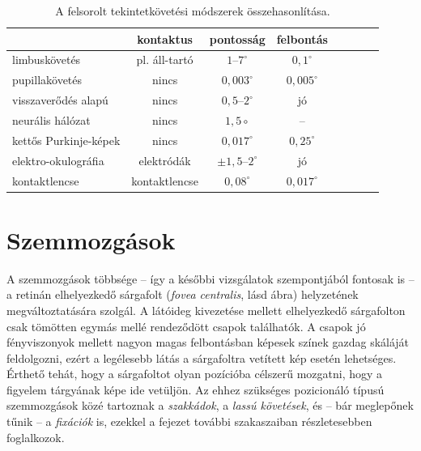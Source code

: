 \begin{table}[ht]
	\centering
	\caption{A felsorolt tekintetkövetési módszerek összehasonlítása.} \label{tab:osszehas}
	\begin{tabular}{ l || c | c | c | c | c | c | c }
	 & kontaktus & pontosság & felbontás \\ \hline \hline
	limbuskövetés & pl. áll-tartó & $1$--$7^\circ$ & $0,\!1^\circ$ \\
	pupillakövetés & nincs & $0,\!003^\circ$ & $0,\!005^\circ$ \\
	visszaverődés alapú & nincs & $0,\!5$--$2^\circ$ & jó \\
	neurális hálózat & nincs & $1,\!5\circ$ & -- \\
	kettős Purkinje-képek & nincs & $0,\!017^\circ$ & $0,\!25^\circ$ \\ 
	elektro-okulográfia & elektródák & $\pm1,\!5$--$2^\circ$ & jó \\
	kontaktlencse & kontaktlencse & $0,\!08^\circ$ & $0,\!017^\circ$ \\
	\end{tabular}
\end{table}

\section{Szemmozgások}\label{sect:osztalyozas}


A szemmozgások többsége -- így a későbbi vizsgálatok szempontjából fontosak is -- a retinán elhelyezkedő sárgafolt (\emph{fovea centralis}, lásd  ábra) helyzetének megváltoztatására szolgál. A látóideg kivezetése mellett elhelyezkedő sárgafolton csak tömötten egymás mellé rendeződött csapok találhatók. A csapok jó fényviszonyok mellett nagyon magas felbontásban képesek színek gazdag skáláját feldolgozni, ezért a legélesebb látás a sárgafoltra vetített kép esetén lehetséges. Érthető tehát, hogy a sárgafoltot olyan pozícióba célszerű mozgatni, hogy a figyelem tárgyának képe ide vetüljön. Az ehhez szükséges pozicionáló típusú szemmozgások közé tartoznak a \emph{szakkádok}, a \emph{lassú követések}, és -- bár meglepőnek tűnik -- a \emph{fixációk} is, ezekkel a fejezet további szakaszaiban részletesebben foglalkozok.

